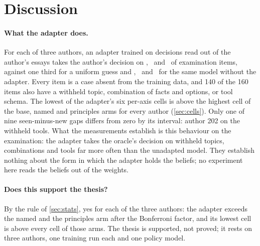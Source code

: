 
\section{Discussion}\label{sec:discussion}

\paragraph{What the adapter does.}
For each of three authors, an adapter trained on decisions read out of the author's essays
takes the author's decision on \AccATuned, \AccBTuned\ and \AccCTuned\ of examination items,
against one third for a uniform guess and \AccABase, \AccBBase\ and \AccCBase\ for the same model
without the adapter. Every item is a case absent from the training data, and 140 of the 160
items also have a withheld topic, combination of facts and options, or tool schema.
The lowest of the adapter's six per-axis cells is above the highest cell of the base, named
and principles arms for every author (\cref{sec:cells}). Only one of nine seen-minus-new gaps
differs from zero by its interval: author 202 on the withheld tools. What the measurements
establish is this behaviour on the examination: the adapter takes the oracle's decision on
withheld topics, combinations and tools far more often than the unadapted model. They
establish nothing about the form in which the adapter holds the beliefs; no experiment here
reads the beliefs out of the weights.

\paragraph{Does this support the thesis?}
By the rule of \cref{sec:stats}, yes for each of the three authors: the adapter exceeds the
named and the principles arm after the Bonferroni factor, and its lowest cell is above every
cell of those arms. The thesis is supported, not proved; it rests on three authors, one
training run each and one policy model.

